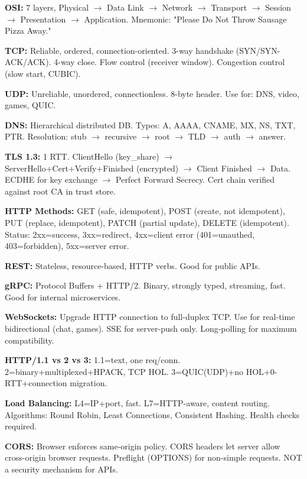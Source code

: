 \documentclass[11pt]{article}
\begin{document}
\textbf{OSI:} 7 layers, Physical \(\rightarrow\) Data Link \(\rightarrow\) Network \(\rightarrow\) Transport \(\rightarrow\) Session \(\rightarrow\) Presentation \(\rightarrow\) Application. Mnemonic: "Please Do Not Throw Sausage Pizza Away."

\textbf{TCP:} Reliable, ordered, connection-oriented. 3-way handshake (SYN/SYN-ACK/ACK). 4-way close. Flow control (receiver window). Congestion control (slow start, CUBIC).

\textbf{UDP:} Unreliable, unordered, connectionless. 8-byte header. Use for: DNS, video, games, QUIC.

\textbf{DNS:} Hierarchical distributed DB. Types: A, AAAA, CNAME, MX, NS, TXT, PTR. Resolution: stub \(\rightarrow\) recursive \(\rightarrow\) root \(\rightarrow\) TLD \(\rightarrow\) auth \(\rightarrow\) answer.

\textbf{TLS 1.3:} 1 RTT. ClientHello (key\_share) \(\rightarrow\) ServerHello+Cert+Verify+Finished (encrypted) \(\rightarrow\) Client Finished \(\rightarrow\) Data. ECDHE for key exchange \(\rightarrow\) Perfect Forward Secrecy. Cert chain verified against root CA in trust store.

\textbf{HTTP Methods:} GET (safe, idempotent), POST (create, not idempotent), PUT (replace, idempotent), PATCH (partial update), DELETE (idempotent). Status: 2xx=success, 3xx=redirect, 4xx=client error (401=unauthed, 403=forbidden), 5xx=server error.

\textbf{REST:} Stateless, resource-based, HTTP verbs. Good for public APIs.

\textbf{gRPC:} Protocol Buffers + HTTP/2. Binary, strongly typed, streaming, fast. Good for internal microservices.

\textbf{WebSockets:} Upgrade HTTP connection to full-duplex TCP. Use for real-time bidirectional (chat, games). SSE for server-push only. Long-polling for maximum compatibility.

\textbf{HTTP/1.1 vs 2 vs 3:} 1.1=text, one req/conn. 2=binary+multiplexed+HPACK, TCP HOL. 3=QUIC(UDP)+no HOL+0-RTT+connection migration.

\textbf{Load Balancing:} L4=IP+port, fast. L7=HTTP-aware, content routing. Algorithms: Round Robin, Least Connections, Consistent Hashing. Health checks required.

\textbf{CORS:} Browser enforces same-origin policy. CORS headers let server allow cross-origin browser requests. Preflight (OPTIONS) for non-simple requests. NOT a security mechanism for APIs.
\end{document}
